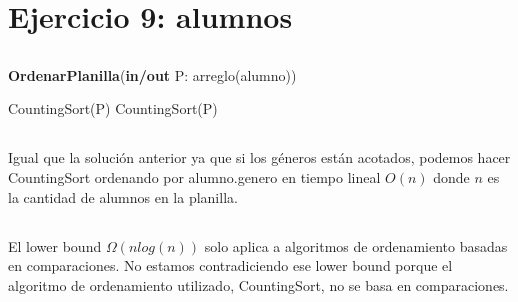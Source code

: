 \section{Ejercicio 9: alumnos}

\subsection{}

\begin{algorithm}[H]
\caption{
    \textbf{OrdenarPlanilla}(\textbf{in/out} P: arreglo(alumno))
}
\begin{algorithmic}[1]
    \State CountingSort(P) 
    \State CountingSort(P) 
\end{algorithmic}
\end{algorithm}

\subsection{}

Igual que la solución anterior ya que si los géneros están acotados, podemos hacer CountingSort ordenando por alumno.genero en tiempo lineal $O(n)$ donde $n$ es la cantidad de alumnos en la planilla.

\subsection{}

El lower bound $\Omega(n log(n))$ solo aplica a algoritmos de ordenamiento basadas en comparaciones. No estamos contradiciendo ese lower bound porque el algoritmo de ordenamiento utilizado, CountingSort, no se basa en comparaciones.
